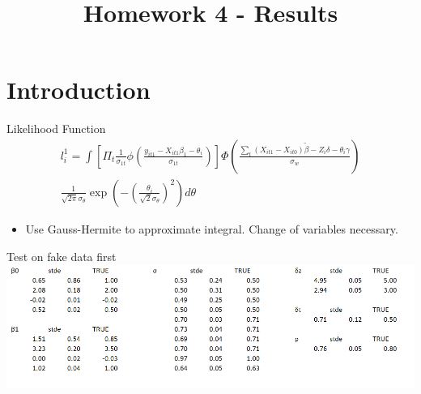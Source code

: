 \documentclass{beamer}
\title{Homework 4 - Results}
\author{}
\institute[]{}
\begin{document}
\frame{
\titlepage
}

\section{Introduction}

\begin{frame}{Likelihood Function}
\begin{align}
l_i^1 = \int [\Pi_t \frac{1}{\sigma_{1t}} \phi(\frac{y_{it1} - X_{it1}\beta_1 - \theta_i}{\sigma_{1t}})]\Phi(\frac{\sum_t (X_{it1} - X_{it0})\tilde{\beta} - Z_i \delta - \theta_i \gamma}{\sigma_w}) \\
 \frac{1}{\sqrt{2 \pi} \sigma_\theta} \exp(- (\frac{\theta_i}{\sqrt{2}\sigma_\theta})^2) d\theta
\end{align}
\begin{itemize}
\item Use Gauss-Hermite to approximate integral. Change of variables necessary.
\end{itemize}
\end{frame}

\begin{frame}{Test on fake data first}
\centering
\includegraphics[scale=0.55]{fake_est.png}
\end{frame}
\end{document}
